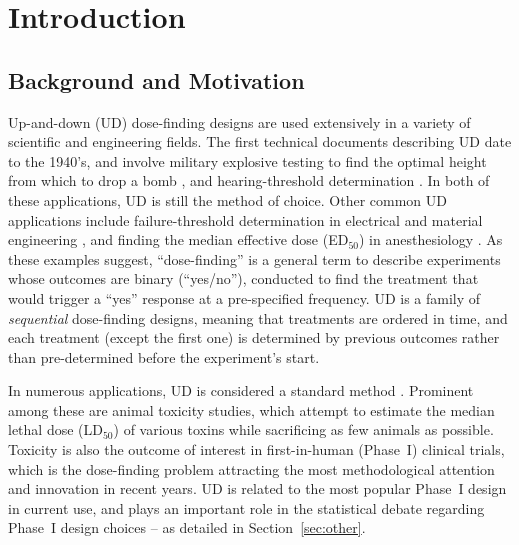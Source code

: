 

\doublespacing




\section{Introduction}\label{sec:intro}
\subsection{Background and Motivation}

Up-and-down (UD) dose-finding designs are used extensively in a variety of scientific and engineering fields. The first technical documents describing UD date to the 1940's, and involve military explosive testing to find the optimal height from which to drop a bomb  \citep{Ande:McCa:Tuke:Stai:1946,Dixo:Mood:Amet:1948}, and hearing-threshold determination \citep{vonB:anew:1947}. In both of these applications, UD is still the method of choice. Other common UD applications include failure-threshold determination in electrical and material engineering \citep{Lago:Sons:Comp:2004}, and finding the median effective dose (ED$_{50}$) in anesthesiology \citep{Pace:styl:tutor:2007}. As these examples suggest, ``dose-finding'' is a general term to describe experiments whose outcomes are binary (``yes/no''), conducted to find the treatment that would trigger a ``yes'' response at a pre-specified frequency. UD is a family of \emph{sequential} dose-finding designs, meaning that treatments are ordered in time, and each treatment (except the first one) is determined by previous outcomes rather than pre-determined before the experiment's start.

In numerous applications, UD is considered a standard method \citep{JSME81, ASTM:Stan:1991,OECD:Revi:1998,NIEH:NIH:2001}. Prominent among these are animal toxicity studies, which attempt to estimate the median lethal dose (LD$_{50}$) of various toxins while sacrificing as few animals as possible. Toxicity is also the outcome of interest in first-in-human (Phase~I) clinical trials, which is the dose-finding problem attracting the most methodological attention and innovation in recent years. UD is related to the most popular Phase~I design in current use, and plays an important role in the statistical debate regarding Phase~I design choices -- as detailed in Section~\ref{sec:other}.

